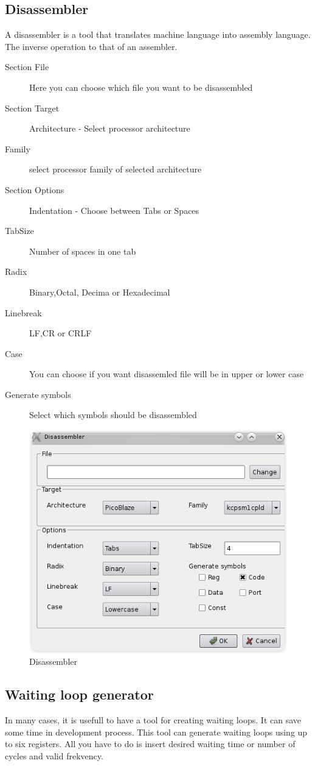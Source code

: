 \subsection{Disassembler}
    A disassembler is a tool that translates machine language into assembly language. The inverse
    operation to that of an assembler.

    \begin{description}
        \item[Section File] Here you can choose which file you want to be disassembled
        \item[Section Target] Architecture - Select processor architecture
        \item[Family] select processor family of selected architecture
        \item[Section Options] Indentation - Choose between Tabs or Spaces
        \item[TabSize] Number of spaces in one tab
        \item[Radix] Binary,Octal, Decima or Hexadecimal
        \item[Linebreak] LF,CR or CRLF
        \item[Case]  You can choose if you want disassemled file will be in upper or lower case
        \item[Generate symbols] Select which symbols should be disassembled
    \end{description}

    \begin{figure}[h]
        \centering{}
        \includegraphics[width=.5\textwidth]{img/disassembler_window.png}
        \caption{Disassembler}
    \end{figure}

\subsection{Waiting loop generator}
    In many cases, it is usefull to have a tool for creating waiting loops. It can save some time in development process. This tool can generate
    waiting loops using up to six registers. All you have to do is insert desired waiting time or number of cycles and valid frekvency.

